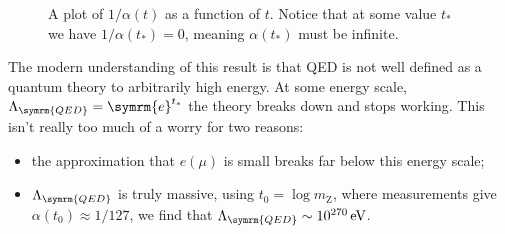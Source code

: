 \documentclass[fleqn]{NotesClass}
\newcommand{\Pparticle}[1]{\mathrm{#1}}
\newcommand{\PZboson}{\ensuremath{\Pparticle{Z}}}
\newcommand{\e}{\symrm{e}}
\begin{document}
    \begin{figure}
        \caption{A plot of \(1/\alpha(t)\) as a function of \(t\). Notice that at some value \(t_*\) we have \(1/\alpha(t_*) = 0\), meaning \(\alpha(t_*)\) must be infinite.}
        \label{fig:fine structure constant plot}
    \end{figure}
    
    The modern understanding of this result is that QED is not well defined as a quantum theory to arbitrarily high energy.
    At some energy scale, \(\Lambda_{\symrm{QED}} = \e^{t_*}\) the theory breaks down and stops working.
    This isn't really too much of a worry for two reasons:
    \begin{itemize}
        \item the approximation that \(e(\mu)\) is small breaks far below this energy scale;
        \item \(\Lambda_{\symrm{QED}}\) is truly massive, using \(t_0 = \log m_{\PZboson}\), where measurements give \(\alpha(t_0) \approx 1/127\), we find that \(\Lambda_{\symrm{QED}} \sim 10^{270} \, \unit{\electronvolt}\).
    \end{itemize}
    
\end{document}
